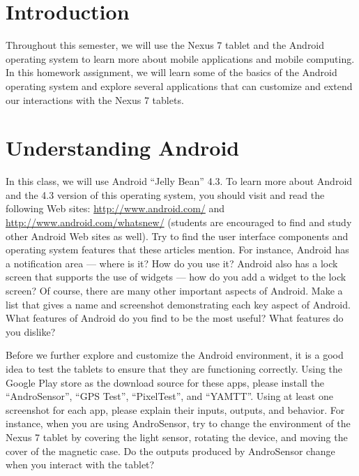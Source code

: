 

\usepackage[compact]{titlesec}



\section*{Introduction}

Throughout this semester, we will use the Nexus 7 tablet and the Android operating system to learn more about mobile
applications and mobile computing.  In this homework assignment, we will learn some of the basics of the Android
operating system and explore several applications that can customize and extend our interactions with the Nexus 7 tablets.

\section*{Understanding Android}

In this class, we will use Android ``Jelly Bean'' 4.3.  To learn more about Android and the 4.3 version of this
operating system, you should visit and read the following Web sites: \url{http://www.android.com/} and
\url{http://www.android.com/whatsnew/} (students are encouraged to find and study other Android Web sites as well). Try
to find the user interface components and operating system features that these articles mention.  For instance, Android
has a notification area --- where is it?  How do you use it? Android also has a lock screen that supports the use of
widgets --- how do you add a widget to the lock screen?  Of course, there are many other important aspects of Android.
Make a list that gives a name and screenshot demonstrating each key aspect of Android.  What features of Android do you
find to be the most useful?  What features do you dislike?

Before we further explore and customize the Android environment, it is a good idea to test the tablets to ensure that
they are functioning correctly.  Using the Google Play store as the download source for these apps, please install the
``AndroSensor'', ``GPS Test'', ``PixelTest'', and ``YAMTT''.  Using at least one screenshot for each app, please explain
their inputs, outputs, and behavior.  For instance, when you are using AndroSensor, try to change the environment of
the Nexus 7 tablet by covering the light sensor, rotating the device, and moving the cover of the magnetic case.  Do the
outputs produced by AndroSensor change when you interact with the tablet?

